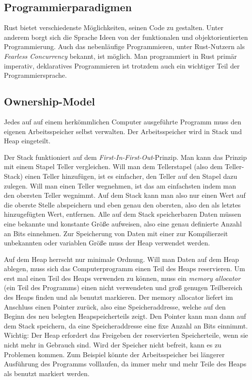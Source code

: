 \subsection{Programmierparadigmen}
Rust bietet verschiedenste Möglichkeiten, seinen Code zu gestalten. Unter
anderem borgt sich die Sprache Ideen von der funktionalen und objektorientierten
Programmierung. Auch das nebenläufige Programmieren, unter Rust-Nutzern als
\textit{Fearless Concurrency} bekannt, ist möglich. Man programmiert in Rust
primär imperativ, deklaratives Programmieren ist trotzdem auch ein wichtiger
Teil der Programmiersprache.

\subsection{Ownership-Model}
Jedes auf auf einem herkömmlichen Computer ausgeführte Programm muss den eigenen Arbeitsspeicher selbst verwalten.
Der Arbeitsspeicher wird in Stack und Heap eingeteilt. \cite{rustlangbookownership1}

Der Stack funktioniert auf dem \textit{First-In-First-Out}-Prinzip. Man kann das Prinzip mit einem Stapel Teller vergleichen.
Will man dem Tellerstapel (also dem Teller-Stack) einen Teller hinzufügen, ist es einfacher,
den Teller auf den Stapel dazu zulegen. Will man einen Teller wegnehmen, ist das am einfachsten indem man den obersten Teller wegnimmt.
Auf dem Stack kann man also nur einen Wert auf die oberste Stelle abspeichern und eben genau den obersten, also den als letztes hinzugefügten
Wert, entfernen. Alle auf dem Stack speicherbaren Daten müssen eine bekannte und konstante Größe aufweisen, also eine genau definierte Anzahl
an Bits einnehmen. Zur Speicherung von Daten mit einer zur Kompilierzeit unbekannten oder variablen Größe muss der Heap verwendet werden.

Auf dem Heap herrscht nur minimale Ordnung. Will man Daten auf dem Heap ablegen, muss sich das Computerprogramm einen Teil des Heaps
reservieren. Um erst mal einen Teil des Heaps verwenden zu können, muss ein \textit{memory allocator} (ein Teil des Programms) einen nicht
verwendeten und groß genugen Teilbereich des Heaps finden und als benutzt markieren. Der memory allocator liefert im Anschluss einen Pointer zurück,
also eine Speicheraddresse, welche auf den Beginn des neu belegten Heapspeicherteils zeigt. Den Pointer kann man dann auf dem Stack speichern, da eine
Speicheraddresse eine fixe Anzahl an Bits einnimmt. Wichtig: Der Heap erfordert das Freigeben der reservierten Speicherteile, wenn sie nicht
mehr in Gebrauch sind. Wird der Speicher nicht befreit, kann es zu Problemen kommen. Zum Beispiel könnte der Arbeitsspeicher bei längerer
Ausführung des Programms volllaufen, da immer mehr und mehr Teile des Heaps als benutzt markiert werden.

